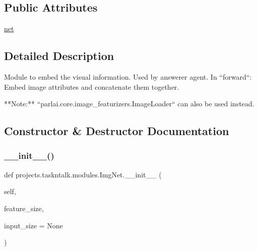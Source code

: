 \subsection*{Public Attributes}
\begin{DoxyCompactItemize}
\item 
\hyperlink{classprojects_1_1taskntalk_1_1modules_1_1ImgNet_ad2f75d9e18e4b10703db9f2ff3a988d2}{net}
\end{DoxyCompactItemize}


\subsection{Detailed Description}
\begin{DoxyVerb}Module to embed the visual information. Used by answerer agent. In ``forward``:
Embed image attributes and concatenate them together.

**Note:** ``parlai.core.image_featurizers.ImageLoader`` can also be
used instead.
\end{DoxyVerb}
 

\subsection{Constructor \& Destructor Documentation}
\mbox{\label{classprojects_1_1taskntalk_1_1modules_1_1ImgNet_a9723f98d54a1fa7607ed0a4dc98f4786}} 
\subsubsection{\texorpdfstring{\+\_\+\+\_\+init\+\_\+\+\_\+()}{\_\_init\_\_()}}
{\footnotesize\ttfamily def projects.\+taskntalk.\+modules.\+Img\+Net.\+\_\+\+\_\+init\+\_\+\+\_\+ (\begin{DoxyParamCaption}\item[{}]{self,  }\item[{}]{feature\+\_\+size,  }\item[{}]{input\+\_\+size = {\ttfamily None} }\end{DoxyParamCaption})}



